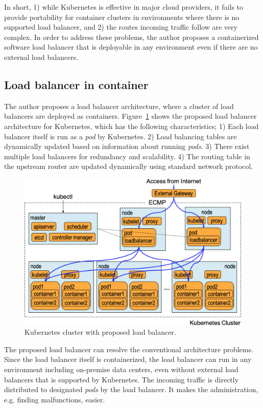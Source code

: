 In short, 1) while Kubernetes is effective in major cloud providers, it fails to provide portability for container clusters in environments where there is no supported load balancer, and 2) the routes incoming traffic follow are very complex.
In order to address these problems, the author proposes a containerized software load balancer 
that is deployable in any environment even if there are no external load balancers.

\FloatBarrier

\subsection{Load balancer in container}

The author proposes a load balancer architecture, where a cluster of load balancers are deployed as containers.
Figure~\ref{fig:K8sProposed} shows the proposed load balancer architecture for Kubernetes,
which has the following characteristics;
1) Each load balancer itself is run as a {\em pod} by Kubernetes. 
2) Load balancing tables are dynamically updated based on information about running {\em pods}.
3) There exist multiple load balancers for redundancy and scalability.
4) The routing table in the upstream router are updated dynamically using standard network protocol.

\begin{figure}[h]
  \centering
  \includegraphics[width=0.8\columnwidth]{Figs/K8sProposed}
  \caption{Kubernetes cluster with proposed load balancer.}
  \label{fig:K8sProposed}
\end{figure}

The proposed load balancer can resolve the conventional architecture problems.
Since the load balancer itself is containerized, the load balancer can run in any environment including on-premise data centers,
even without external load balancers that is supported by Kubernetes.
The incoming traffic is directly distributed to designated {\em pods} by the load balancer.
It makes the administration, e.g. finding malfunctions, easier.

